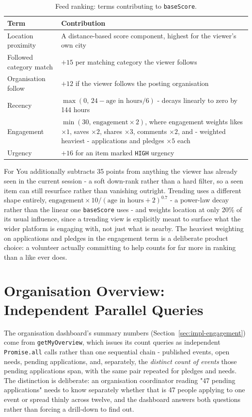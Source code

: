 \begin{table}[H]\centering
\caption{Feed ranking: terms contributing to \texttt{baseScore}.}
\label{tab:feed-scoring}
\begin{tabularx}{\textwidth}{|p{}|Y|}
\hline
\textbf{Term} & \textbf{Contribution}\\\hline
Location proximity & A distance-based score component, highest for the viewer's own city\\\hline
Followed category match & $+15$ per matching category the viewer follows\\\hline
Organisation follow & $+12$ if the viewer follows the posting organisation\\\hline
Recency & $\max(0,\,24 - \text{age in hours}/6)$ - decays linearly to zero by 144 hours\\\hline
Engagement & $\min(30,\,\text{engagement} \times 2)$, where engagement weights likes $\times 1$, saves $\times 2$, shares $\times 3$, comments $\times 2$, and - weighted heaviest - applications and pledges $\times 5$ each\\\hline
Urgency & $+16$ for an item marked \texttt{HIGH} urgency\\\hline
\end{tabularx}
\end{table}

\noindent For You additionally subtracts 35 points from anything the viewer has already seen in the current session - a soft down-rank rather than a hard filter, so a seen item can still resurface rather than vanishing outright. Trending uses a different shape entirely, $\text{engagement} \times 10 / (\text{age in hours} + 2)^{0.7}$ - a power-law decay rather than the linear one \texttt{baseScore} uses - and weights location at only 20\% of its usual influence, since a trending view is explicitly meant to surface what the wider platform is engaging with, not just what is nearby. The heaviest weighting on applications and pledges in the engagement term is a deliberate product choice: a volunteer actually committing to help counts for far more in ranking than a like ever does.

\section{Organisation Overview: Independent Parallel Queries}
\label{sec:deepdive-overview}
The organisation dashboard's summary numbers (Section~\ref{sec:impl-engagement}) come from \texttt{getMyOverview}, which issues its count queries as independent \texttt{Promise.all} calls rather than one sequential chain - published events, open needs, pending applications, and, separately, the \emph{distinct count of events} those pending applications span, with the same pair repeated for pledges and needs. The distinction is deliberate: an organisation coordinator reading "47 pending applications" needs to know separately whether that is 47 people applying to one event or spread thinly across twelve, and the dashboard answers both questions rather than forcing a drill-down to find out.

